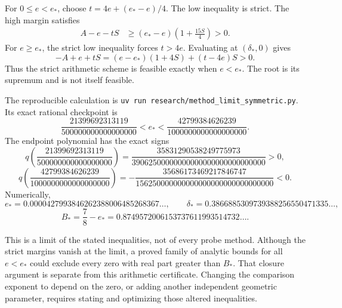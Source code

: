 \documentclass[11pt]{article}
\begin{document}
For $0\leq e<e_*$, choose $t=4e+(e_*-e)/4$. The low inequality is
strict. The high margin satisfies
\begin{align*}
 A-e-tS
 &\geq (e_*-e)\left(1+\frac{15S}{4}\right)>0.
\end{align*}
For $e\geq e_*$, the strict low inequality forces $t>4e$. Evaluating
at $(\delta_*,0)$ gives
\[
 -A+e+tS=(e-e_*)(1+4S)+(t-4e)S>0.
\]
Thus the strict arithmetic scheme is feasible exactly when $e<e_*$.
The root is its supremum and is not itself feasible.

The reproducible calculation is
\texttt{uv run research/method\_limit\_symmetric.py}.
Its exact rational checkpoint is
\[
 \frac{21399692313119}{500000000000000000}
 <e_*<
 \frac{42799384626239}{1000000000000000000}.
\]
The endpoint polynomial has the exact signs
\[
 q\left(\frac{21399692313119}{500000000000000000}\right)
 =\frac{35831290538249775973}{39062500000000000000000000000000}>0,
\]
\[
 q\left(\frac{42799384626239}{1000000000000000000}\right)
 =-\frac{35686173469217846747}{156250000000000000000000000000000}<0.
\]
Numerically,
\[
 e_* =0.0000427993846262388006485268367\ldots,
 \qquad \delta_* =0.3866885309739388256550471335\ldots,
\]
\[
 B_* =\frac78-e_*=0.8749572006153737611993514732\ldots.
\]

This is a limit of the stated inequalities, not of every probe method.
Although the strict margins vanish at the limit, a proved family of
analytic bounds for all $e<e_*$ could exclude every zero with real part
greater than $B_*$. That closure argument is separate from this
arithmetic certificate. Changing the comparison exponent to depend on
the zero, or adding another independent geometric parameter, requires
stating and optimizing those altered inequalities.
\end{document}
